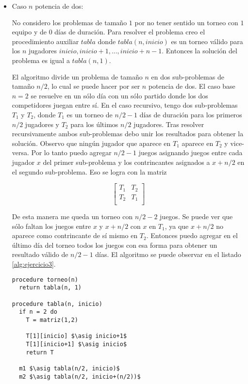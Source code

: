 \documentclass{article}
\newcommand{\asig}{\ensuremath{\leftarrow}}
\begin{document}
\begin{itemize}

\item Caso $n$ potencia de dos:

No considero los problemas de tamaño $1$ por no tener sentido un torneo con $1$ equipo y de $0$
días de duración. Para resolver el problema creo el procedimiento auxiliar $tabla$ donde
$tabla(n, inicio)$ es un torneo válido para los $n$ jugadores $inicio, inicio+1, ..., inicio+n-1$.
Entonces la solución del problema es igual a $tabla(n, 1)$.

El algoritmo divide un problema de tamaño $n$ en dos sub-problemas
de tamaño $n/2$, lo cual se puede hacer por ser $n$ potencia de dos. El caso base $n = 2$
se resuelve en un sólo día con un sólo partido donde los dos competidores juegan entre sí.
En el caso recursivo, tengo dos sub-problemas $T_1$ y $T_2$, donde $T_1$ es un torneo de $n/2-1$ días
de duración para los primeros $n/2$ jugadores y $T_2$ para los últimos $n/2$ jugadores. Tras resolver
recursivamente ambos sub-problemas debo unir los resultados para obtener la solución. Observo que ningún
jugador que aparece en $T_1$ aparece en $T_2$ y vice-versa. Por lo tanto puedo agregar $n/2-1$ juegos
asignando juegos entre cada jugador $x$ del primer sub-problema y los contrincantes asignados a $x+n/2$
en el segundo sub-problema. Eso se logra con la matriz

$$
\left[
\begin{array}{cc}
T_1 & T_2 \\
T_2 & T_1 \\
\end{array}
\right]
$$

De esta manera me queda un torneo con $n/2-2$ juegos. Se puede ver que sólo faltan los juegos
entre $x$ y $x+n/2$ con $x$ en $T_1$, ya que $x+n/2$ no aparece como contrincante de sí mismo
en $T_2$. Entonces puedo agregar en el último día del torneo todos los juegos con esa forma para
obtener un resultado válido de $n/2-1$ días. El algoritmo se puede observar en el listado
\ref{alg:ejercicio3}.

\begin{lstlisting}[float,caption={Solución al ejercicio 3},label=alg:ejercicio3]
procedure torneo(n)
  return tabla(n, 1)

procedure tabla(n, inicio)
  if n = 2 do
    T = matriz(1,2)

    T[1][inicio] $\asig inicio+1$
    T[1][inicio+1] $\asig inicio$
    return T

  m1 $\asig tabla(n/2, inicio)$
  m2 $\asig tabla(n/2, inicio+(n/2))$


\end{lstlisting}
\end{itemize}
\end{document}
